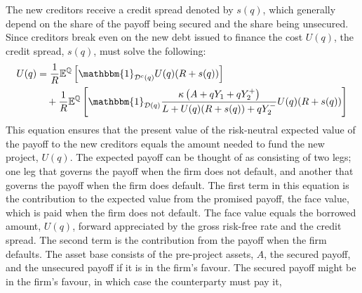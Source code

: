 \documentclass[../main.tex]{subfiles}
\begin{document}
        The new creditors receive a credit spread denoted by $s(q)$,
        which generally depend on the share of the payoff being secured and the share being unsecured.
        Since creditors break even on the new debt issued to finance the cost $U(q)$,
        the credit spread, $s(q)$, must solve the following:
            \begin{align}
                    U(q) 
                &=
                    \discountfactor
                    \mathbb{E}^{\rnmeasure}\left[
                        \mathbbm{1}_{\mathcal{D}^{c}(q)}
                        U(q)
                        (\grossrfrate + s(q))
                    \right]
                \nonumber \\
                &\quad+
                    \discountfactor
                    \mathbb{E}^{\rnmeasure}\left[
                        \mathbbm{1}_{\mathcal{D}(q)}
                        \frac{
                            \kappa 
                            \left(
                                A + q Y_{1} + q Y_{2}^{+}
                            \right)
                        }{
                            L 
                            +
                            U(q)
                            (\grossrfrate + s(q))
                            +
                            q Y_{2}^{-} 
                        } 
                        U(q)
                        (\grossrfrate + s(q))    
                    \right] 
                \label{eqn:new-creditors-breakeven}
            \end{align}
        This equation ensures that the present value of the risk-neutral expected value of the payoff to the new creditors
        equals the amount needed to fund the new project, $U(q)$. 
        The expected payoff can be thought of as consisting of two legs;
        one leg that governs the payoff when the firm does not default, 
        and another that governs the payoff when the firm does default. 
        The first term in this equation is the contribution to the expected value from the promised payoff,
        the face value, which is paid when the firm does not default. 
        The face value equals the borrowed amount, $U(q)$, 
        forward appreciated by the gross risk-free rate and the credit spread.
        The second term is the contribution from the payoff when the firm defaults. 
        The asset base consists of the pre-project assets, $A$, 
        the secured payoff, and the unsecured payoff if it is in the firm's favour.
        The secured payoff might be in the firm's favour, in which case the counterparty must pay it, 
\end{document}
